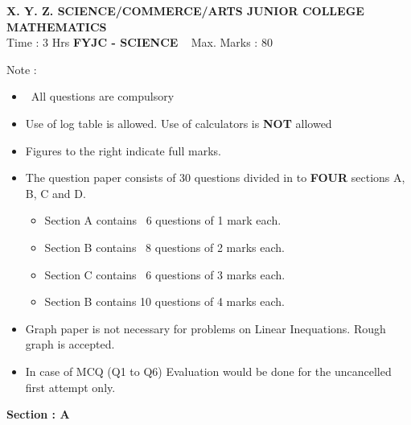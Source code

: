 \documentclass[12pt,a4paper]{article}
\begin{document}
\begin{center}
\textbf {X. Y. Z. SCIENCE/COMMERCE/ARTS JUNIOR COLLEGE } \\
\textbf{MATHEMATICS} \\

Time : 3 Hrs \hspace {3.6cm} \textbf {FYJC - SCIENCE}  \hspace{2.9cm} Max. Marks : 80

\end{center}

Note :

\begin {itemize}
\item  All questions are compulsory 

\item Use of log table is allowed. Use of calculators is \textbf{NOT} allowed

\item Figures to the right indicate full marks.

\item The question paper consists of 30 questions divided in to \textbf{FOUR} sections A, B, C and D. 

\begin {itemize}

\item Section A contains  6 questions of 1 mark each.

\item Section B contains  8 questions of 2 marks each.

\item Section C contains  6 questions of 3 marks each.

\item Section B contains 10 questions of 4 marks each.

\end{itemize}

\item Graph paper is not necessary for problems on Linear Inequations. Rough graph is accepted.

\item In case of MCQ (Q1 to Q6) Evaluation would be done for the uncancelled first attempt only. 

\end{itemize}


\begin{center}

\textbf {Section : A}

\end{center}
\end{document}
